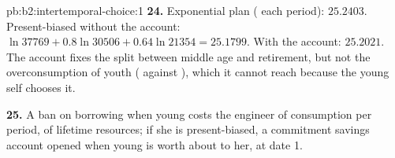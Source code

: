 \begin{solution}{pb:b2:intertemporal-choice:1}
\textbf{24.} Exponential plan ( each period): $25.2403$. Present-biased without the account:
$\ln\num{37769} + 0.8\ln\num{30506} + 0.64\ln\num{21354} = 25.1799$. With the account: $25.2021$. The
account fixes the split between middle age and retirement, but not the overconsumption of youth
( against ), which it cannot reach because the young self chooses it.

\textbf{25.} A ban on borrowing when young costs the engineer  of consumption per period,
 of lifetime resources; if she is present-biased, a commitment savings account opened when
young is worth about  to her, at date 1.
\end{solution}
